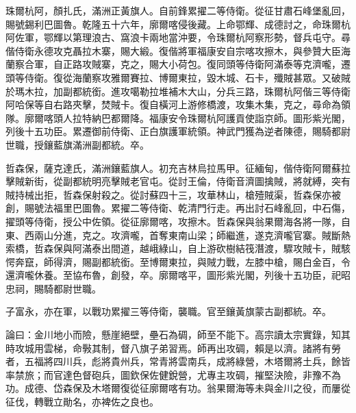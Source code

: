 \begin{pinyinscope}
珠爾杭阿，顏扎氏，滿洲正黃旗人。自前鋒累擢二等侍衛。從征甘肅石峰堡亂回，賜號錫利巴圖魯。乾隆五十六年，廓爾喀侵後藏。上命鄂輝、成德討之，命珠爾杭阿佐軍，鄂輝以第理浪古、窩浪卡兩地當沖要，令珠爾杭阿察形勢，督兵屯守。尋偕侍衛永德攻克聶拉木寨，賜大緞。復偕將軍福康安自宗喀攻擦木，與參贊大臣海蘭察合軍，自正路攻賊寨，克之，賜大小荷包。復同頭等侍衛阿滿泰等克濟嚨，遷頭等侍衛。復從海蘭察攻雅爾賽拉、博爾東拉，毀木城、石卡，殲賊甚眾。又破賊於瑪木拉，加副都統銜。進攻噶勒拉堆補木大山，分兵三路，珠爾杭阿偕三等侍衛阿哈保等自右路夾擊，焚賊卡。復自橫河上游修橋渡，攻集木集，克之，尋命為領隊。廓爾喀頭人拉特納巴都爾降。福康安令珠爾杭阿護貢使詣京師。圖形紫光閣，列後十五功臣。累遷御前侍衛、正白旗護軍統領。神武門獲為逆者陳德，賜騎都尉世職，授鑲藍旗滿洲副都統。卒。

哲森保，薩克達氏，滿洲鑲藍旗人。初充吉林烏拉馬甲。征緬甸，偕侍衛阿爾蘇拉擊賊新街，從副都統明亮擊賊老官屯。從討王倫，侍衛音濟圖擒賊，將就縛，突有賊持械出拒，哲森保射殺之。從討蘇四十三，攻華林山，槍殪賊渠，哲森保亦被創，賜號法福里巴圖魯。累擢二等侍衛、乾清門行走。再出討石峰亂回，中石傷，擢頭等侍衛，授公中佐領。從征廓爾喀，攻擦木。哲森保與翁果爾海各將一隊，自東、西兩山分進，克之。攻濟嚨，首奪東南山梁；師繼進，遂克濟嚨官寨。賊斷熱索橋，哲森保與阿滿泰出間道，越峨綠山，自上游砍樹結筏潛渡，驟攻賊卡，賊駭愕奔竄，師得濟，賜副都統銜。至博爾東拉，與賊力戰，左膝中槍，賜白金百，令還濟嚨休養。至協布魯，創發，卒。廓爾喀平，圖形紫光閣，列後十五功臣，祀昭忠祠，賜騎都尉世職。

子富永，亦在軍，以戰功累擢三等侍衛，襲職。官至鑲黃旗蒙古副都統。卒。

論曰：金川地小而險，懸崖絕壁，壘石為碉，師至不能下。高宗讀太宗實錄，知其時攻城用雲梯，命斅其制，督八旗子弟習焉。師再出攻碉，賴是以濟。諸將有勞者，五福將四川兵，彪將貴州兵，常青將雲南兵，成將綠營，木塔爾將土兵，餘皆率禁旅；而官達色督砲兵，圖欽保佐健銳營，尤專主攻碉，摧堅決險，非豫不為功。成德、岱森保及木塔爾復從征廓爾喀有功。翁果爾海等未與金川之役，而屢從征伐，轉戰立勛名，亦裨佐之良也。


\end{pinyinscope}
